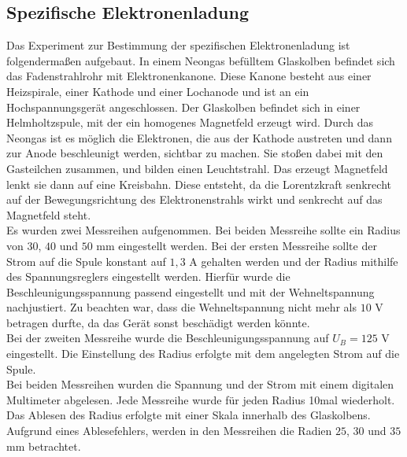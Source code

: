 \documentclass[a4paper,usenatbib]{aspdoc}
\begin{document}
        \subsection{Spezifische Elektronenladung}
            Das Experiment zur Bestimmung der spezifischen Elektronenladung ist folgendermaßen aufgebaut. In einem Neongas befülltem Glaskolben befindet sich das Fadenstrahlrohr mit Elektronenkanone. Diese Kanone besteht aus einer Heizspirale, einer Kathode und einer Lochanode und ist an ein Hochspannungsgerät angeschlossen. Der Glaskolben befindet sich in einer Helmholtzspule, mit der ein homogenes Magnetfeld erzeugt wird. Durch das Neongas ist es möglich die Elektronen, die aus der Kathode austreten und dann zur Anode beschleunigt werden, sichtbar zu machen. Sie stoßen dabei mit den Gasteilchen zusammen, und bilden einen Leuchtstrahl. Das erzeugt Magnetfeld lenkt sie dann auf eine Kreisbahn. Diese entsteht, da die Lorentzkraft senkrecht auf der Bewegungsrichtung des Elektronenstrahls wirkt und senkrecht auf das Magnetfeld steht.\\
            Es wurden zwei Messreihen aufgenommen. Bei beiden Messreihe sollte ein Radius von $30$, $40$ und $50$ mm eingestellt werden. Bei der ersten Messreihe sollte der Strom auf die Spule konstant auf $1,3$ A gehalten werden und der Radius mithilfe des Spannungsreglers eingestellt werden. Hierfür wurde die Beschleunigungsspannung passend eingestellt und mit der Wehneltspannung nachjustiert. Zu beachten war, dass die Wehneltspannung nicht mehr als $10$ V betragen durfte, da das Gerät sonst beschädigt werden könnte.\\
            Bei der zweiten Messreihe wurde die Beschleunigungsspannung auf $U_B = 125$ V eingestellt. Die Einstellung des Radius erfolgte mit dem angelegten Strom auf die Spule.\\
            Bei beiden Messreihen wurden die Spannung und der Strom mit einem digitalen Multimeter abgelesen. Jede Messreihe wurde für jeden Radius 10mal wiederholt. Das Ablesen des Radius erfolgte mit einer Skala innerhalb des Glaskolbens. Aufgrund eines Ablesefehlers, werden in den Messreihen die Radien $25$, $30$ und $35$ mm betrachtet.\\ 
        
\end{document}
